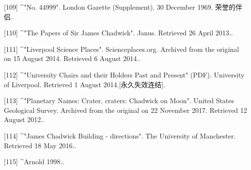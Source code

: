 [109]
^"No. 44999". London Gazette (Supplement). 30 December 1969. 荣誉的伴侣.

[110]
^"The Papers of Sir James Chadwick". Janus. Retrieved 26 April 2013..

[111]
^"Liverpool Science Places". Scienceplaces.org. Archived from the original on 15 August 2014. Retrieved 6 August 2014..

[112]
^"University Chairs and their Holders Past and Present" (PDF). University of Liverpool. Retrieved 1 August 2014.[永久失效连结].

[113]
^"Planetary Names: Crater, craters: Chadwick on Moon". United States Geological Survey. Archived from the original on 22 November 2017. Retrieved 12 August 2012..

[114]
^"James Chadwick Building - directions". The University of Manchester. Retrieved 18 May 2016..

[115]
^Arnold 1998..